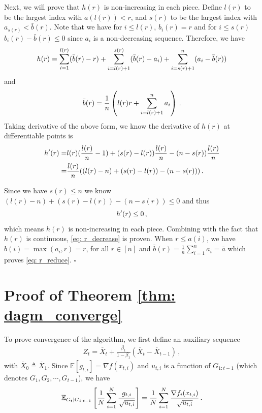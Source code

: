 \documentclass[11pt]{article}
\begin{document}
Next, we will prove that $h(r)$ is  non-increasing in each piece.
Define $ l(r)$ to be the largest index with $a(l(r)) < r$, and $s(r)$ to be the largest index with $a_{s(r)} < \bar b(r)$. Note that we have for $i \leq l(r)$, $b_i(r) = r$ and for $i \leq s(r)$ $b_i(r) - \bar b(r) \leq 0$ since $a_i$ is a non-decreasing sequence. 
Therefore, we have 
\begin{align}\notag
h(r) = \sum_{i=1}^{l(r)} (\bar b(r) - r) + \sum_{i= l(r)+1} ^{s(r) } (\bar b(r) - a_i) + \sum_{i= s(r)+1}^n (a_i - \bar b(r))
\end{align}
and 
\begin{align}\notag
\bar b(r) = \frac{1}{n}\left (l(r) r + \sum_{i=l(r)+1}^n a_i\right) \, .
\end{align}
Taking derivative of the above form, we know the derivative of $h(r)$ at differentiable points is
\begin{align}\notag
\begin{split}
h'(r) = &l(r) (\frac{l(r)}{n}-1) + (s(r)-l(r)) \frac{l(r)}{n} - (n-s(r)) \frac{l(r)}{n}  \\
= & \frac{l(r)}{n} ((l(r) - n) + (s(r) - l(r)) - (n-s(r))) \, .
\end{split}
\end{align}

Since we have $s(r) \leq n$ we know $(l(r) - n) + (s(r) - l(r)) - (n-s(r)) \leq 0$ and thus
\begin{align}\notag
h'(r) \leq 0 \, ,
\end{align}
which means $h(r)$ is non-increasing in each piece. Combining with the fact that $h(r)$ is continuous, \eqref{eq: r_decrease} is proven.
When $r \leq a(i)$, we have $b(i) = \max(a_i,r) = r$, for all $r \in [n]$ and $\bar b(r) = \frac{1}{n}\sum_{i=1}^n a_i = \bar a$ which proves \eqref{eq: r_reduce}.
\hfill $\square$


\clearpage

\section{Proof of Theorem \ref{thm: dagm_converge}}\label{app: proof_thm_adm}


To prove convergence of the algorithm, we first define an auxiliary sequence 
\begin{align}\label{eq: seq_z}
Z_{t} = \overline X_t + \frac{\beta_1}{1-\beta_1} (\overline X_t - \overline X_{t-1}) \, ,
\end{align}
with $\overline X_{0} \triangleq \overline X_1$.
Since $\mathbb E[g_{t,i}] = \nabla f(x_{t,i})$ and $u_{t,i}$ is a function of $G_{1:t-1}$ (which denotes $G_1,G_2,\cdots,G_{t-1}$), we have 
\begin{align}\notag
\mathbb E_{G_t|G_{1:t-1}} \left[\frac{1}{N} \sum_{i=1}^N \frac{g_{t,i}}{\sqrt{u_{t,i}}}\right] =\frac{1}{N} \sum_{i=1}^N \frac{\nabla f_i(x_{t,i})}{\sqrt{u_{t,i}}} \, .
\end{align}
\end{document}
